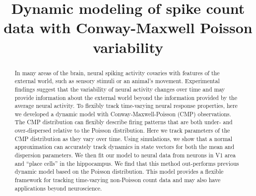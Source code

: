 \documentclass[aoas]{imsart}
\theoremstyle{plain}
\theoremstyle{remark}
\begin{document}
\begin{frontmatter}
\title{Dynamic modeling of spike count data with Conway-Maxwell Poisson variability}


\begin{abstract}
In many areas of the brain, neural spiking activity covaries with features of the external world, such as sensory stimuli or an animal’s movement. Experimental findings suggest that the variability of neural activity changes over time and may provide information about the external world beyond the information provided by the average neural activity. To flexibly track time-varying neural response properties, here we developed a dynamic model with Conway-Maxwell-Poisson (CMP) observations. The CMP distribution can flexibly describe firing patterns that are both under- and over-dispersed relative to the Poisson distribution. Here we track parameters of the CMP distribution as they vary over time. Using simulations, we show that a normal approximation can accurately track dynamics in state vectors for both the mean and dispersion parameters. We then fit our model to neural data from neurons in V1 area and “place cells” in the hippocampus. We find that this method out-performs previous dynamic model based on the Poisson distribution. This model provides a flexible framework for tracking time-varying non-Poisson count data and may also have applications beyond neuroscience.
\end{abstract}

\begin{keyword}
\end{keyword}

\end{frontmatter}
\end{document}
